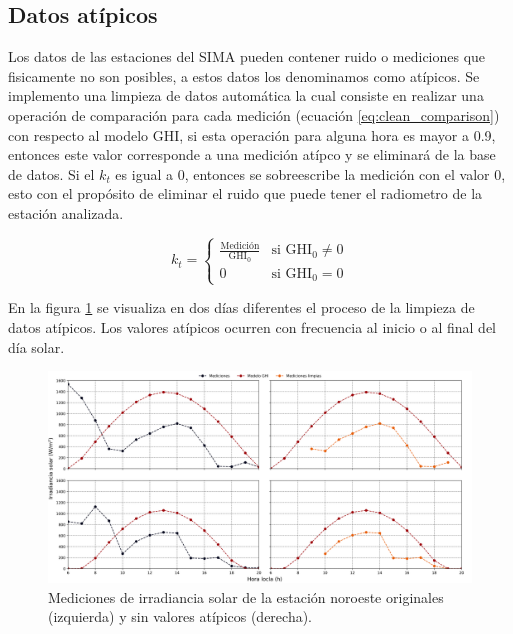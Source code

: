 \subsection{Datos atípicos}

Los datos de las estaciones del SIMA pueden contener ruido o mediciones que fisicamente no son posibles, a estos datos los denominamos como atípicos. Se implemento una limpieza de datos automática la cual consiste en realizar una operación de comparación para cada medición (ecuación \ref{eq:clean_comparison}) con respecto al modelo GHI, si esta operación para alguna hora es mayor a 0.9, entonces este valor corresponde a una medición atípco y se eliminará de la base de datos. Si el $k_t$ es igual a 0, entonces se sobreescribe la medición con el valor 0, esto con el propósito de eliminar el ruido que puede tener el radiometro de la estación analizada.

\begin{equation}
	k_t =\begin{cases}
		\frac{\text{Medición}}{\text{GHI}_0} & \text{si GHI}_0\neq 0 \\
		0                                    & \text{si GHI}_0 = 0
	\end{cases}
	\label{eq:clean_comparison}
\end{equation}

En la figura \ref{fig:example_clean_data} se visualiza en dos días diferentes el proceso de la limpieza de datos atípicos. Los valores atípicos ocurren con frecuencia al inicio o al final del día solar.

\begin{figure}[H]
	\centering
	\includegraphics[width=12cm]{Graphics/example_clean_data.png}
	\caption{Mediciones de irradiancia solar de la estación noroeste originales (izquierda) y sin valores atípicos (derecha).}
	\label{fig:example_clean_data}
\end{figure}

